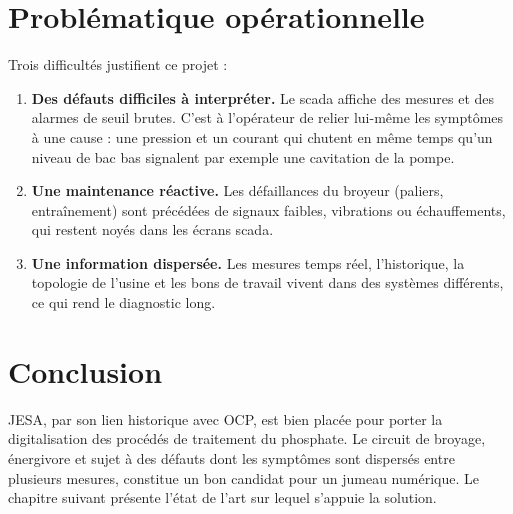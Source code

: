 \section{Problématique opérationnelle}
Trois difficultés justifient ce projet :
\begin{enumerate}
  \item \textbf{Des défauts difficiles à interpréter.} Le \gls{scada} affiche des mesures et des alarmes de seuil brutes. C'est à l'opérateur de relier lui-même les symptômes à une cause : une pression et un courant qui chutent en même temps qu'un niveau de bac bas signalent par exemple une cavitation de la pompe.
  \item \textbf{Une maintenance réactive.} Les défaillances du broyeur (paliers, entraînement) sont précédées de signaux faibles, vibrations ou échauffements, qui restent noyés dans les écrans \gls{scada}.
  \item \textbf{Une information dispersée.} Les mesures temps réel, l'historique, la topologie de l'usine et les bons de travail vivent dans des systèmes différents, ce qui rend le diagnostic long.
\end{enumerate}

\section{Conclusion}
JESA, par son lien historique avec OCP, est bien placée pour porter la digitalisation des procédés de traitement du phosphate. Le circuit de broyage, énergivore et sujet à des défauts dont les symptômes sont dispersés entre plusieurs mesures, constitue un bon candidat pour un jumeau numérique. Le chapitre suivant présente l'état de l'art sur lequel s'appuie la solution.
